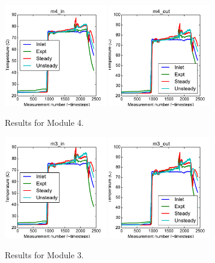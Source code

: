 \documentclass{article}
\begin{document}
\clearpage
\begin{figure}[!ht]
\centering
\includegraphics[width=0.4\textwidth]{../../data/ICSolar/images/Mar09_m4_in_compare.pdf}\hspace{0.05\textwidth}
\includegraphics[width=0.4\textwidth]{../../data/ICSolar/images/Mar09_m4_out_compare.pdf}\hspace{0.05\textwidth}\\
\caption{Results for Module 4.}\end{figure}
\begin{figure}[!ht]
\centering
\includegraphics[width=0.4\textwidth]{../../data/ICSolar/images/Mar09_m3_in_compare.pdf}\hspace{0.05\textwidth}
\includegraphics[width=0.4\textwidth]{../../data/ICSolar/images/Mar09_m3_out_compare.pdf}\hspace{0.05\textwidth}\\
\caption{Results for Module 3.}\end{figure}
\end{document}
